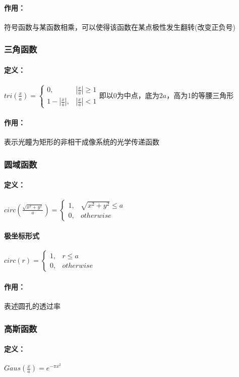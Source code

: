 \documentclass[UTF8]{ctexart}
\newcommand{\f}[2]{\frac{#1}{#2}}%
\begin{document}
\paragraph{作用：}符号函数与某函数相乘，可以使得该函数在某点极性发生翻转(改变正负号)
\subsubsection{三角函数}
\paragraph{定义：}
$
tri(\f{x}{a})=
\begin{cases}
0, & |\f{x}{a}|\ge 1 \\
1-|\f{x}{a}|, &|\f{x}{a}|<1 
\end{cases}
$即以0为中点，底为$2a$，高为1的等腰三角形
\paragraph{作用：}表示光瞳为矩形的非相干成像系统的光学传递函数
\subsubsection{圆域函数}
\paragraph{定义：}
$circ(\f{\sqrt{x^2+y^2}}{a})=
\begin{cases}
    1,&\sqrt{x^2+y^2}\le a\\
    0,&otherwise
\end{cases}$
\paragraph{极坐标形式}$circ(r)=
\begin{cases}
    1,&r\le a\\
    0,&otherwise
\end{cases}
$
\paragraph{作用：}表述圆孔的透过率
\subsubsection{高斯函数}
\paragraph{定义：}
$Gaus(\f{x}{a})=e^{-\pi x^2}$
\end{document}
